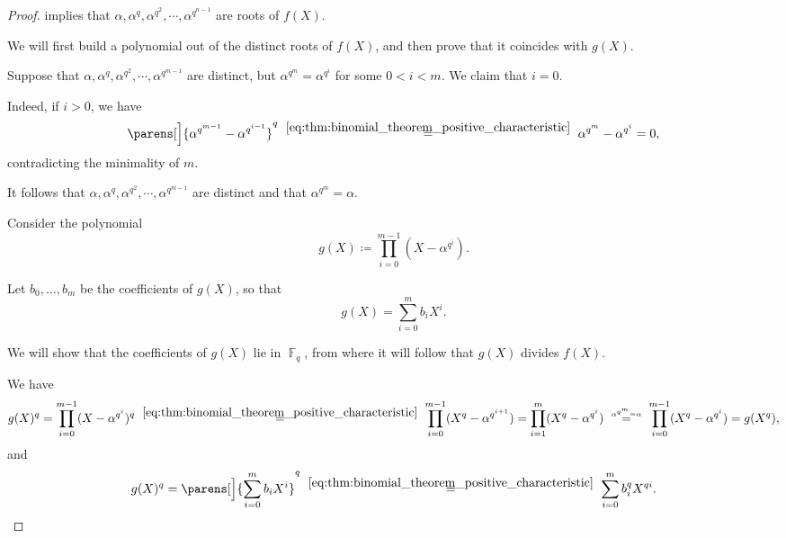 \begin{proof}
   implies that \( \alpha, \alpha^q, \alpha^{q^2}, \cdots, \alpha^{q^{n-1}} \) are roots of \( f(X) \).

  We will first build a polynomial out of the distinct roots of \( f(X) \), and then prove that it coincides with \( g(X) \).

  Suppose that \( \alpha, \alpha^q, \alpha^{q^2}, \cdots, \alpha^{q^{m-1}} \) are distinct, but \( \alpha^{q^m} = \alpha^{q^i} \) for some \( 0 < i < m \). We claim that \( i = 0 \).

  Indeed, if \( i > 0 \), we have
  \begin{equation*}
    \parens[\Big]{ \alpha^{q^{m-1}} - \alpha^{q^{i-1}} }^q
    \reloset {\eqref{eq:thm:binomial_theorem_positive_characteristic}} =
    \alpha^{q^m} - \alpha^{q^i}
    =
    0,
  \end{equation*}
  contradicting the minimality of \( m \).

  It follows that \( \alpha, \alpha^q, \alpha^{q^2}, \cdots, \alpha^{q^{m-1}} \) are distinct and that \( \alpha^{q^m} = \alpha \).

  Consider the polynomial
  \begin{equation*}
    g(X) \coloneqq \prod_{i=0}^{m-1} (X - \alpha^{q^i}).
  \end{equation*}

  Let \( b_0, \ldots, b_m \) be the coefficients of \( g(X) \), so that
  \begin{equation*}
    g(X) = \sum_{i=0}^m b_i X^i.
  \end{equation*}

  We will show that the coefficients of \( g(X) \) lie in \( \BbbF_q \), from where it will follow that \( g(X) \) divides \( f(X) \).

  We have
  \begin{align*}
    g(X)^q
    =
    \prod_{i=0}^{m-1} (X - \alpha^{q^i})^q
    \reloset {\eqref{eq:thm:binomial_theorem_positive_characteristic}} =
    \prod_{i=0}^{m-1} (X^q - \alpha^{q^{i + 1}})
    =
    \prod_{i=1}^m (X^q - \alpha^{q^i})
    \reloset {\alpha^{q^m} = \alpha} =
    \prod_{i=0}^{m-1} (X^q - \alpha^{q^i})
    =
    g(X^q),
  \end{align*}
  and
  \begin{equation*}
    g(X)^q
    =
    \parens[\Big]{ \sum_{i=0}^m b_i X^i }^q
    \reloset {\eqref{eq:thm:binomial_theorem_positive_characteristic}} =
    \sum_{i=0}^m b_i^q X^{qi}.
  \end{equation*}


\end{proof}

